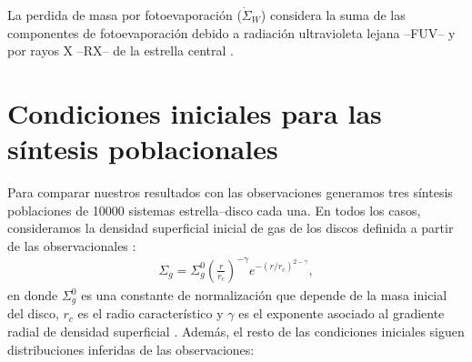 \documentclass[baaa]{baaa}
\begin{document}
La perdida de masa por fotoevaporaci\'on ($\dot{\Sigma}_W $) considera la suma de las componentes de fotoevaporaci\'on debido a radiación ultravioleta lejana --FUV-- \citep{kunitoma2021tasas} y por rayos X --RX-- \citet{owen2010implementationfoto} de la estrella central \citep[ver][para más detalles]{Ronco2021, Ronco2024}.


\vspace{-.25 cm}


\section{Condiciones iniciales para las síntesis poblacionales}

Para comparar nuestros resultados con las observaciones generamos tres síntesis poblaciones de 10000 sistemas estrella--disco cada una. En todos los casos, consideramos la densidad superficial inicial de gas de los discos definida a partir de las observacionales \citep{Andrews_2010}:
\begin{align}
    \Sigma_{g} = \Sigma_{g}^{0} \left(\frac{r}{r_c}\right)^{-\gamma} e^{-(r/r_c)^{2-\gamma}},
    \label{eq:densi_inicial}
\end{align}
en donde $\Sigma_{g}^{0}$ es una constante de normalización que depende de la masa inicial del disco, $r_{c}$ es el radio característico y $\gamma$ es el exponente asociado al gradiente radial de densidad superficial \citep[en todos los casos adoptamos $\gamma$= 0.9 inferido de las observaciones][]{Andrews_2010}. Además, el resto de las condiciones iniciales siguen distribuciones inferidas de las observaciones:  %
\end{document}
